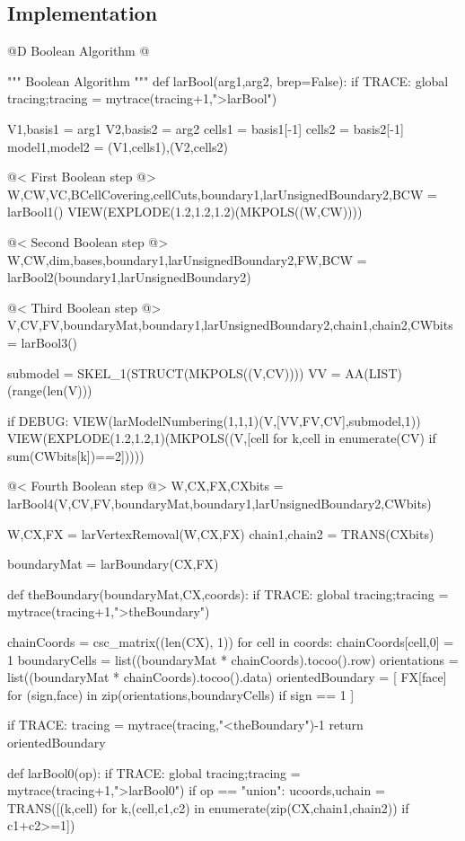 \documentclass[11pt,oneside]{article}	%
\begin{document}
\subsection{Implementation}


@D Boolean Algorithm
@{""" Boolean Algorithm """
def larBool(arg1,arg2, brep=False):
	if TRACE: global tracing;tracing = mytrace(tracing+1,">larBool")

	V1,basis1 = arg1
	V2,basis2 = arg2
	cells1 = basis1[-1]
	cells2 = basis2[-1]
	model1,model2 = (V1,cells1),(V2,cells2)
		
	@< First Boolean step @>
	W,CW,VC,BCellCovering,cellCuts,boundary1,larUnsignedBoundary2,BCW = larBool1()
	VIEW(EXPLODE(1.2,1.2,1.2)(MKPOLS((W,CW))))
	
	@< Second Boolean step @>
	W,CW,dim,bases,boundary1,larUnsignedBoundary2,FW,BCW = larBool2(boundary1,larUnsignedBoundary2)

	@< Third Boolean step @>
	V,CV,FV,boundaryMat,boundary1,larUnsignedBoundary2,chain1,chain2,CWbits = larBool3()
	
	submodel = SKEL_1(STRUCT(MKPOLS((V,CV))))
	VV = AA(LIST)(range(len(V)))
	
	if DEBUG:
		VIEW(larModelNumbering(1,1,1)(V,[VV,FV,CV],submodel,1))
		VIEW(EXPLODE(1.2,1.2,1)(MKPOLS((V,[cell for k,cell in enumerate(CV) if sum(CWbits[k])==2]))))
	
	@< Fourth Boolean step @>
	W,CX,FX,CXbits = larBool4(V,CV,FV,boundaryMat,boundary1,larUnsignedBoundary2,CWbits)

	W,CX,FX = larVertexRemoval(W,CX,FX)
	chain1,chain2 = TRANS(CXbits)
	
	boundaryMat = larBoundary(CX,FX)

	def theBoundary(boundaryMat,CX,coords):
		if TRACE: global tracing;tracing = mytrace(tracing+1,">theBoundary")

		chainCoords = csc_matrix((len(CX), 1))
		for cell in coords: chainCoords[cell,0] = 1
		boundaryCells = list((boundaryMat * chainCoords).tocoo().row)
		orientations = list((boundaryMat * chainCoords).tocoo().data)
		orientedBoundary = [ FX[face] for (sign,face) in zip(orientations,boundaryCells)  if sign == 1 ]

		if TRACE: tracing = mytrace(tracing,"<theBoundary")-1
		return orientedBoundary


	def larBool0(op):
		if TRACE: global tracing;tracing = mytrace(tracing+1,">larBool0")
		if op == "union": 
			ucoords,uchain = TRANS([(k,cell) for k,(cell,c1,c2) in enumerate(zip(CX,chain1,chain2)) if c1+c2>=1])

}
\end{document}
